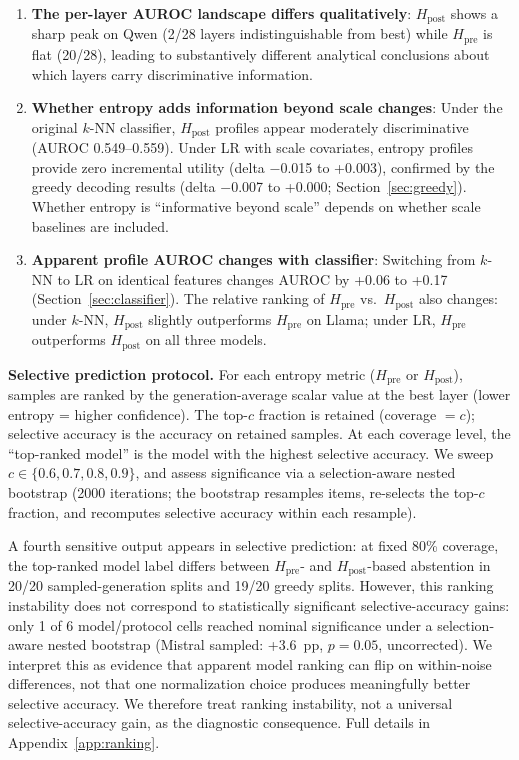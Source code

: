 \documentclass{ieeeaccess}
\newcommand{\Hpre}{H_{\text{pre}}}
\newcommand{\Hpost}{H_{\text{post}}}
\begin{document}
\begin{enumerate}
\item \textbf{The per-layer AUROC landscape differs qualitatively}: $\Hpost$ shows a sharp peak on Qwen (2/28 layers indistinguishable from best) while $\Hpre$ is flat (20/28), leading to substantively different analytical conclusions about which layers carry discriminative information.

\item \textbf{Whether entropy adds information beyond scale changes}: Under the original $k$-NN classifier, $\Hpost$ profiles appear moderately discriminative (AUROC 0.549--0.559). Under LR with scale covariates, entropy profiles provide zero incremental utility (delta $-$0.015 to +0.003), confirmed by the greedy decoding results (delta $-$0.007 to +0.000; Section~\ref{sec:greedy}). Whether entropy is ``informative beyond scale'' depends on whether scale baselines are included.

\item \textbf{Apparent profile AUROC changes with classifier}: Switching from $k$-NN to LR on identical features changes AUROC by +0.06 to +0.17 (Section~\ref{sec:classifier}). The relative ranking of $\Hpre$ vs.\ $\Hpost$ also changes: under $k$-NN, $\Hpost$ slightly outperforms $\Hpre$ on Llama; under LR, $\Hpre$ outperforms $\Hpost$ on all three models.
\end{enumerate}

\textbf{Selective prediction protocol.} For each entropy metric ($\Hpre$ or $\Hpost$), samples are ranked by the generation-average scalar value at the best layer (lower entropy = higher confidence). The top-$c$ fraction is retained (coverage $= c$); selective accuracy is the accuracy on retained samples. At each coverage level, the ``top-ranked model'' is the model with the highest selective accuracy. We sweep $c \in \{0.6, 0.7, 0.8, 0.9\}$, and assess significance via a selection-aware nested bootstrap (2000 iterations; the bootstrap resamples items, re-selects the top-$c$ fraction, and recomputes selective accuracy within each resample).

A fourth sensitive output appears in selective prediction: at fixed 80\% coverage, the top-ranked model label differs between $\Hpre$- and $\Hpost$-based abstention in 20/20 sampled-generation splits and 19/20 greedy splits. However, this ranking instability does not correspond to statistically significant selective-accuracy gains: only 1 of 6 model/protocol cells reached nominal significance under a selection-aware nested bootstrap (Mistral sampled: +3.6~pp, $p = 0.05$, uncorrected). We interpret this as evidence that apparent model ranking can flip on within-noise differences, not that one normalization choice produces meaningfully better selective accuracy. We therefore treat ranking instability, not a universal selective-accuracy gain, as the diagnostic consequence. Full details in Appendix~\ref{app:ranking}.
\end{document}
